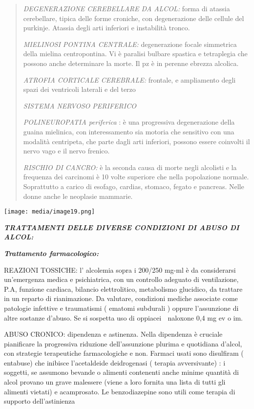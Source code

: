\documentclass[]{article}
\begin{document}
\begin{quote}
\emph{DEGENERAZIONE CEREBELLARE DA ALCOL:} forma di atassia cerebellare,
tipica delle forme croniche, con degenerazione delle cellule del
purkinje. Atassia degli arti inferiori e instabilità tronco.

\emph{MIELINOSI PONTINA CENTRALE:} degenerazione focale simmetrica della
mielina centropontina. Vi è paralisi bulbare spastica e tetraplegia che
possono anche determinare la morte. Il pz è in perenne ebrezza alcolica.

\emph{ATROFIA CORTICALE CEREBRALE:} frontale, e ampliamento degli spazi
dei ventricoli laterali e del terzo

\emph{SISTEMA NERVOSO PERIFERICO}

\emph{POLINEUROPATIA periferica} : è una progressiva degenerazione della
guaina mielinica, con interessamento sia motoria che sensitivo con una
modalità centripeta, che parte dagli arti inferiori, possono essere
coinvolti il nervo vago e il nervo frenico.

\emph{RISCHIO DI CANCRO:} è la seconda causa di morte negli alcolisti e
la frequenza dei carcinomi è 10 volte superiore che nella popolazione
normale. Soprattutto a carico di esofago, cardias, stomaco, fegato e
pancreas. Nelle donne anche le neoplasie mammarie.
\end{quote}

\texttt{[image: media/image19.png]}

\textbf{\emph{TRATTAMENTI DELLE DIVERSE CONDIZIONI DI ABUSO DI ALCOL:}}

\textbf{\emph{Trattamento farmacologico:}}

REAZIONI TOSSICHE: l' alcolemia sopra i 200/250 mg-ml è da considerarsi
un'emergenza medica e psichiatrica, con un controllo adeguato di
ventilazione, P.A, funzione cardiaca, bilancio elettrolitico,
metabolismo glucidico, da trattare in un reparto di rianimazione. Da
valutare, condizioni mediche associate come patologie infettive e
traumatismi ( ematomi subdurali ) oppure l'assunzione di altre sostanze
d'abuso. Se si sospetta uso di oppiacei  naloxone 0,4 mg ev o im.

ABUSO CRONICO: dipendenza e astinenza. Nella dipendenza è cruciale
pianificare la progressiva riduzione dell'assunzione plurima e
quotidiana d'alcol, con strategie terapeutiche farmacologiche e non.
Farmaci usati sono disulfiram ( entabuse) che inibisce l'acetaldeide
deidrogenasi ( terapia avversivante) : i soggetti, se assumono bevande o
alimenti contenenti anche minime quantità di alcol provano un grave
malessere (viene a loro fornita una lista di tutti gli alimenti vietati)
e acamprosato. Le benzodiazepine sono utili come terapia di supporto
dell'astinienza
\end{document}
